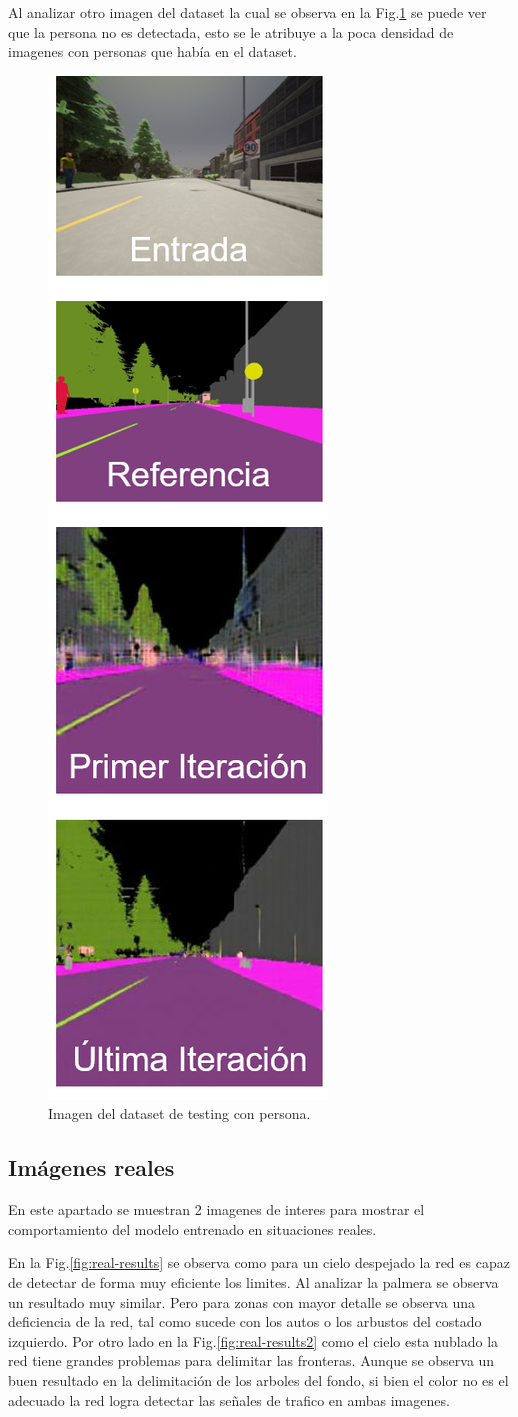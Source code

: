 \documentclass[]{IEEEtran}
\begin{document}
    Al analizar otro imagen del dataset la cual se observa en la Fig.\ref{fig:person_image}
    se puede ver que la persona no es detectada, esto se le atribuye a la poca densidad de imagenes con personas 
    que había en el dataset.

    \begin{figure}
        \centering
        \includegraphics[width=.25\textwidth]{Imgs/results-2.png}
        \caption{Imagen del dataset de testing con persona.}
        \label{fig:person_image}
    \end{figure}

    \subsection{Imágenes reales}

    En este apartado se muestran 2 imagenes de interes para mostrar el comportamiento del modelo entrenado en situaciones reales.

    En la Fig.\ref{fig:real-results} se observa como para un cielo despejado la red es capaz de detectar de forma muy eficiente los limites. 
    Al analizar la palmera se observa un resultado muy similar. Pero para zonas con mayor detalle se observa una deficiencia de la red, tal 
    como sucede con los autos o los arbustos del costado izquierdo. Por otro lado en la Fig.\ref{fig:real-results2} como el cielo esta nublado 
    la red tiene grandes problemas para delimitar las fronteras. Aunque se observa un buen resultado en la delimitación de los arboles del fondo, 
    si bien el color no es el adecuado la red logra detectar las señales de trafico en ambas imagenes.
\end{document}
